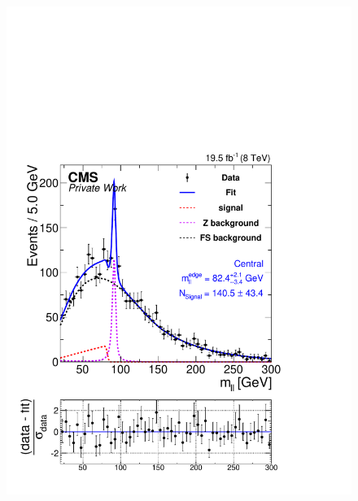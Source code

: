 \begin{figure}[hbp]
  \centering
  \begin{minipage}[t]{0.49\textwidth}
    \includegraphics[width=\textwidth]{plots/results/fit/fit2012_ETHTriangle_SignalInclusive_Combined_Full2012_ETHTriangle_Central.pdf}
  \end{minipage}
  \begin{minipage}[t]{0.49\textwidth}

\end{minipage}
\end{figure}
